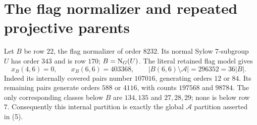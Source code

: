 \documentclass[11pt,a4paper]{article}
\begin{document}
\section*{The flag normalizer and repeated projective parents}
Let $B$ be row $22$, the flag normalizer of order $8232$.
Its normal Sylow 7-subgroup $U$ has order $343$ and is row $170$;
$B=\mathrm N_G(U)$. The literal retained flag model gives
\[
x_B(4,6)=0,\qquad x_B(6,6)=403368,
\qquad |B(6,6)\setminus\mathcal A|=296352=36|B|.            \tag{5}
\]
Indeed its internally covered pairs number $107016$, generating
orders $12$ or $84$. Its remaining pairs generate orders $588$
or $4116$, with counts $197568$ and $98784$. The only corresponding
classes below $B$ are $134,135$ and $27,28,29$; none is below row $7$.
Consequently this internal partition is exactly the global
$\mathcal A$ partition asserted in (5).
\end{document}
